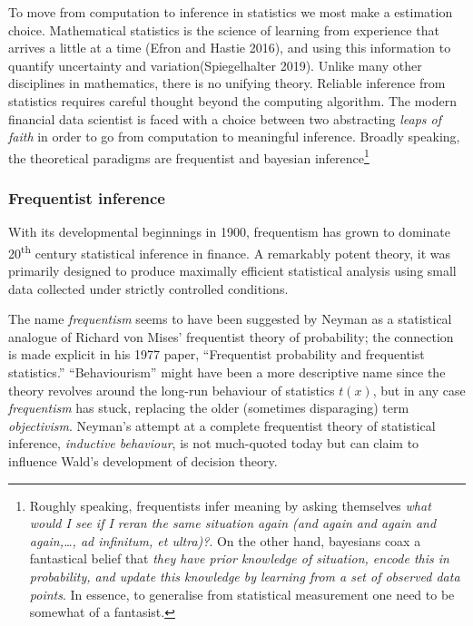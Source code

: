 \documentclass{article}
\begin{document}
To move from computation to inference in statistics we most make a
estimation choice. Mathematical statistics is the science of learning
from experience that arrives a little at a time (Efron and Hastie 2016),
and using this information to quantify uncertainty and
variation(Spiegelhalter 2019). Unlike many other disciplines in
mathematics, there is no unifying theory. Reliable inference from
statistics requires careful thought beyond the computing algorithm. The
modern financial data scientist is faced with a choice between two
abstracting \emph{leaps of faith} in order to go from computation to
meaningful inference. Broadly speaking, the theoretical paradigms are
frequentist and bayesian inference\footnote{Roughly speaking,
  frequentists infer meaning by asking themselves \emph{what would I see
  if I reran the same situation again (and again and again and
  again,\ldots, ad infinitum, et ultra)?}. On the other hand, bayesians
  coax a fantastical belief that \emph{they have prior knowledge of
  situation, encode this in probability, and update this knowledge by
  learning from a set of observed data points}. In essence, to
  generalise from statistical measurement one need to be somewhat of a
  fantasist.}

\hypertarget{frequentist-inference}{%
\subsubsection{Frequentist inference}\label{frequentist-inference}}

With its developmental beginnings in 1900, frequentism has grown to
dominate 20\textsuperscript{th} century statistical inference in
finance. A remarkably potent theory, it was primarily designed to
produce maximally efficient statistical analysis using small data
collected under strictly controlled conditions.

The name \emph{frequentism} seems to have been suggested by Neyman as a
statistical analogue of Richard von Mises' frequentist theory of
probability; the connection is made explicit in his 1977 paper,
``Frequentist probability and frequentist statistics.'' ``Behaviourism''
might have been a more descriptive name since the theory revolves around
the long-run behaviour of statistics \(t(x)\), but in any case
\emph{frequentism} has stuck, replacing the older (sometimes
disparaging) term \emph{objectivism}. Neyman's attempt at a complete
frequentist theory of statistical inference, \emph{inductive behaviour},
is not much-quoted today but can claim to influence Wald's development
of decision theory.
\end{document}
